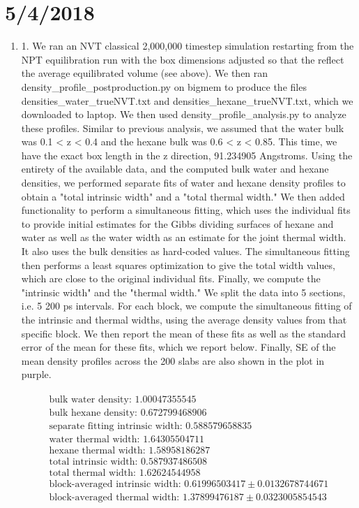 \documentclass[12pt,reqno]{amsart}
\numberwithin{equation}{section}
\begin{document}
\section{5/4/2018}

\begin{enumerate}
\item 1.  We ran an NVT classical 2,000,000 timestep simulation restarting from the NPT equilibration run with the box dimensions adjusted so that the reflect the average equilibrated volume (see above).  We then ran density\_profile\_postproduction.py on bigmem to produce the files densities\_water\_trueNVT.txt and densities\_hexane\_trueNVT.txt, which we downloaded to laptop.  We then used density\_profile\_analysis.py to analyze these profiles.  Similar to previous analysis, we assumed that the water bulk was 0.1 < z < 0.4 and the hexane bulk was 0.6 < z < 0.85.  This time, we have the exact box length in the z direction, 91.234905 Angstroms.  Using the entirety of the available data, and the computed bulk water and hexane densities, we performed separate fits of water and hexane density profiles to obtain a "total intrinsic width" and a "total thermal width."   We then added functionality to perform a simultaneous fitting, which uses the individual fits to provide initial estimates for the Gibbs dividing surfaces of hexane and water as well as the water width as an estimate for the joint thermal width.  It also uses the bulk densities as hard-coded values.  The simultaneous fitting then performs a least squares optimization to give the total width values, which are close to the original individual fits.  Finally, we compute the "intrinsic width" and the "thermal width."  We split the data into 5 sections, i.e. 5 200 ps intervals.  For each block, we compute the simultaneous fitting of the intrinsic and thermal widths, using the average density values from that specific block.  We then report the mean of these fits as well as the standard error of the mean for these fits, which we report below.  Finally, SE of the mean density profiles across the 200 slabs are also shown in the plot in purple.   

\begin{align}
\begin{split}
\text{bulk water density: } 1.00047355545 \\
\text{bulk hexane density: } 0.672799468906 \\
\text{separate fitting intrinsic width: } 0.588579658835 \\
\text{water thermal width: } 1.64305504711 \\
\text{hexane thermal width: } 1.58958186287 \\
\text{total intrinsic width: } 0.587937486508 \\
\text{total thermal width: } 1.62624544958 \\
\text{block-averaged intrinsic width: } 0.61996503417 \pm 0.0132678744671 \\
\text{block-averaged thermal width: } 1.37899476187 \pm 0.0323005854543 \\
\end{split}
\end{align} 


\end{enumerate}
\end{document}
